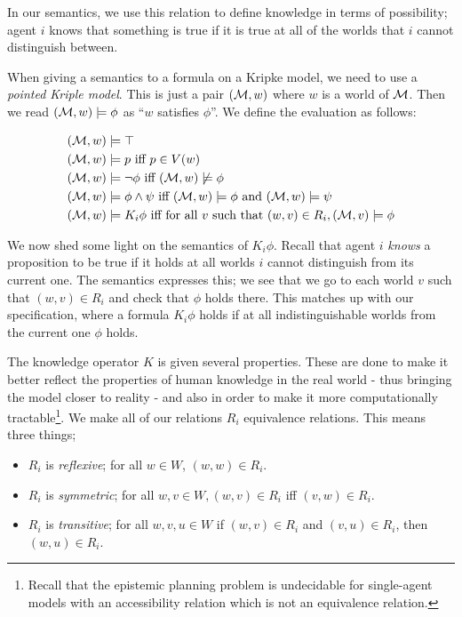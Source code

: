 \documentclass[10pt, a4paper]{report}
\begin{document}
In our semantics, we use this relation to define knowledge in terms of
possibility; agent $i$ knows that something is true if it is true at all of the
worlds that $i$ cannot distinguish between.

\bigskip

When giving a semantics to a formula on a Kripke model, we need to use a
\emph{pointed Kriple model}. This is just a pair $(\mathcal{M}, w)$ where $w$ is a
world of $\mathcal{M}$. Then we read $(\mathcal{M}, w) \models \phi$ as ``$w$ satisfies
$\phi$''. We define the evaluation as follows:

\begin{align*}
  (\mathcal{M}, w) & \models \top \\
  (\mathcal{M}, w) & \models p \text{ iff } p \in V(w) \\
  (\mathcal{M}, w) & \models \neg \phi \text{ iff } (\mathcal{M}, w) \not \models \phi \\
  (\mathcal{M}, w) & \models \phi \land \psi \text{ iff } (\mathcal{M}, w) \models \phi \text{ and } (\mathcal{M}, w) \models \psi \\
  (\mathcal{M}, w) & \models K_i \phi \text{ iff for all $v$ such that } (w, v) \in R_i, (\mathcal{M}, v) \models \phi 
\end{align*}

We now shed some light on the semantics of $K_i \phi$. Recall that agent $i$
\emph{knows} a proposition to be true if it holds at all worlds $i$ cannot
distinguish from its current one. The semantics expresses this; we see that we
go to each world $v$ such that $(w, v) \in R_i$ and check that $\phi$ holds
there. This matches up with our specification, where a formula $K_i \phi$ holds
if at all indistinguishable worlds from the current one $\phi$ holds.

\bigskip 

The knowledge operator $K$ is given several properties. These are done to make
it better reflect the properties of human knowledge in the real world - thus
bringing the model closer to reality - and also in order to make it more
computationally tractable\footnote{Recall that the epistemic planning problem is
  undecidable for single-agent models with an accessibility relation which is
  not an equivalence relation.}. We make all of our relations $R_i$ equivalence
relations. This means three things;

\begin{itemize}
\item $R_i$ is \emph{reflexive}; for all $w \in W$, $(w, w) \in R_i$.
\item $R_i$ is \emph{symmetric}; for all $w, v \in W, (w, v) \in R_i$ iff $(v,
  w) \in R_i$.
\item $R_i$ is \emph{transitive}; for all $w, v, u \in W$ if $(w, v) \in R_i$
  and $(v, u) \in R_i$, then $(w, u) \in R_i$.
\end{itemize}
\end{document}
